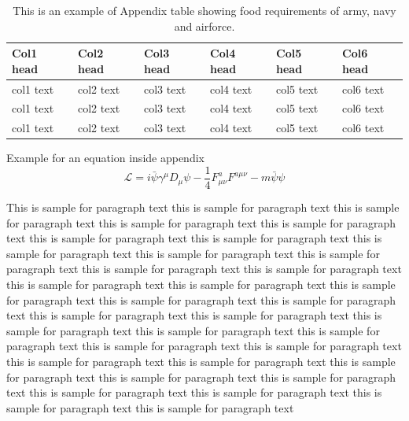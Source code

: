 \documentclass[ASNA,twocolumn]{USG} %
\begin{document}
{\begin{table}[t]%
\centering
\caption{This is an example of Appendix table showing food requirements of army, navy and airforce.\label{tab4}}%
\begin{tabular*}{\textwidth}{@{\extracolsep\fill}llllll@{\extracolsep\fill}}%
\toprule
\textbf{Col1 head} & \textbf{Col2 head} & \textbf{Col3 head} & \textbf{Col4 head} & \textbf{Col5 head} & \textbf{Col6 head} \\
\midrule
col1 text & col2 text & col3 text & col4 text & col5 text & col6 text\\
col1 text & col2 text & col3 text & col4 text & col5 text & col6 text\\
col1 text & col2 text & col3 text& col4 text & col5 text & col6 text\\
\bottomrule
\end{tabular*}
\end{table}


Example for an equation inside appendix
\begin{equation}
{\mathcal{L}} = i \bar{\psi} \gamma^\mu D_\mu \psi - \frac{1}{4} F_{\mu\nu}^a F^{a\mu\nu} - m \bar{\psi} \psi\label{eq25}
\end{equation}

%
\vspace*{12pt}
This is sample for paragraph text this is sample for paragraph text  this is sample for paragraph text this is sample for paragraph text this is sample for paragraph text this is sample for paragraph text this is sample for paragraph text this is sample for paragraph text this is sample for paragraph text this is sample for paragraph text this is sample for paragraph text this is sample for paragraph text this is sample for paragraph text this is sample for paragraph text this is sample for paragraph text this is sample for paragraph text this is sample for paragraph text this is sample for paragraph text this is sample for paragraph text this is sample for paragraph text this is sample for paragraph text this is sample for paragraph text this is sample for paragraph text this is sample for paragraph text this is sample for paragraph text this is sample for paragraph text this is sample for paragraph text this is sample for paragraph text this is sample for paragraph text this is sample for paragraph text this is sample for paragraph text this is sample for paragraph text this is sample for paragraph text



}
\end{document}
